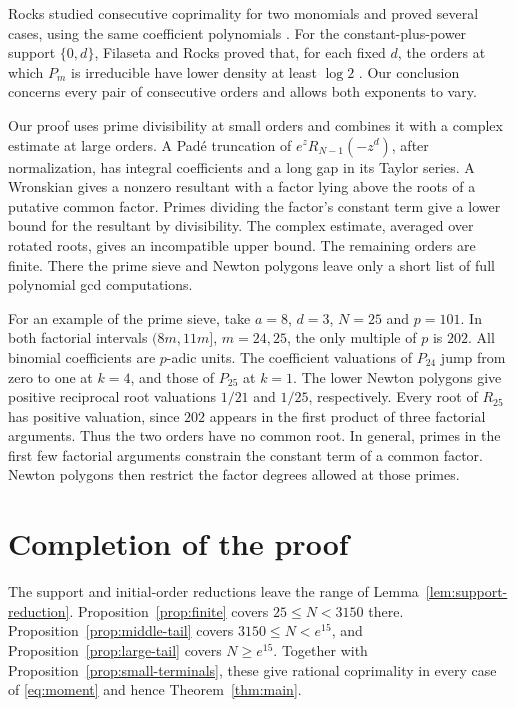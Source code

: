 \documentclass[11pt]{article}
\theoremstyle{remark}
\begin{document}
Rocks studied consecutive coprimality for two monomials and proved
several cases, using the same coefficient polynomials
\cite[Section 3.4]{rocks}. For the constant-plus-power support
\(\{0,d\}\), Filaseta and Rocks proved that, for each fixed \(d\), the
orders at which \(P_m\) is irreducible have lower density at least
\(\log 2\) \cite[Theorem 1.1]{filaseta-rocks}. Our conclusion concerns
every pair of consecutive orders and allows both exponents to vary.

Our proof uses prime divisibility at small orders and combines it with
a complex estimate at large orders. A Pad\'e truncation of
\(e^zR_{N-1}(-z^d)\), after normalization, has integral coefficients
and a long gap in its Taylor series. A Wronskian gives a nonzero
resultant with a factor lying above the roots of a putative common
factor. Primes dividing the factor's constant term give a lower
bound for the resultant by divisibility. The complex estimate,
averaged over rotated roots, gives an incompatible upper bound.
The remaining orders are finite. There the prime sieve and Newton
polygons leave only a short list of full polynomial gcd computations.

For an example of the prime sieve, take \(a=8\), \(d=3\), \(N=25\)
and \(p=101\). In both factorial intervals \((8m,11m]\),
\(m=24,25\), the only multiple of \(p\) is \(202\). All binomial
coefficients are \(p\)-adic units. The coefficient valuations of
\(P_{24}\) jump from zero to one at \(k=4\), and those of \(P_{25}\)
at \(k=1\). The lower Newton polygons give positive reciprocal
root valuations \(1/21\) and \(1/25\), respectively. Every root of
\(R_{25}\) has positive valuation, since \(202\) appears in the
first product of three factorial arguments. Thus the two orders
have no common root. In general, primes in the first few factorial
arguments constrain the constant term of a common factor. Newton
polygons then restrict the factor degrees allowed at those primes.






\section{Completion of the proof}

The support and initial-order reductions leave the range of
Lemma~\ref{lem:support-reduction}. Proposition~\ref{prop:finite}
covers \(25\le N<3150\) there. Proposition~\ref{prop:middle-tail}
covers \(3150\le N<e^{15}\), and
Proposition~\ref{prop:large-tail} covers \(N\ge e^{15}\).
Together with Proposition~\ref{prop:small-terminals}, these give
rational coprimality in every case of \eqref{eq:moment} and hence
Theorem~\ref{thm:main}.
\end{document}

